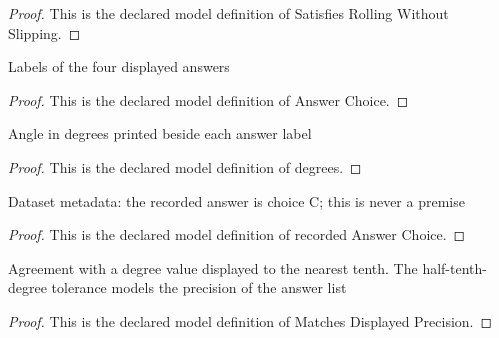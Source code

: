 \begin{proof}
  This is the declared model definition of Satisfies Rolling Without Slipping.
\end{proof}
\begin{definition}
  \label{def:physics:phyx-mini-0736:phyxminiproblems-problemphyxmini0736-answerchoice}
  Labels of the four displayed answers
\end{definition}
\begin{proof}
  This is the declared model definition of Answer Choice.
\end{proof}
\begin{definition}[degrees]
  \label{def:physics:phyx-mini-0736:phyxminiproblems-problemphyxmini0736-answerchoice-degrees}
  Angle in degrees printed beside each answer label
\end{definition}
\begin{proof}
  This is the declared model definition of degrees.
\end{proof}
\begin{definition}
  \label{def:physics:phyx-mini-0736:phyxminiproblems-problemphyxmini0736-recordedanswerchoice}
  Dataset metadata: the recorded answer is choice C; this is never a premise
\end{definition}
\begin{proof}
  This is the declared model definition of recorded Answer Choice.
\end{proof}
\begin{definition}
  \label{def:physics:phyx-mini-0736:phyxminiproblems-problemphyxmini0736-matchesdisplayedprecision}
  Agreement with a degree value displayed to the nearest tenth. The half-tenth-degree tolerance models the precision of the answer list
\end{definition}
\begin{proof}
  This is the declared model definition of Matches Displayed Precision.
\end{proof}
